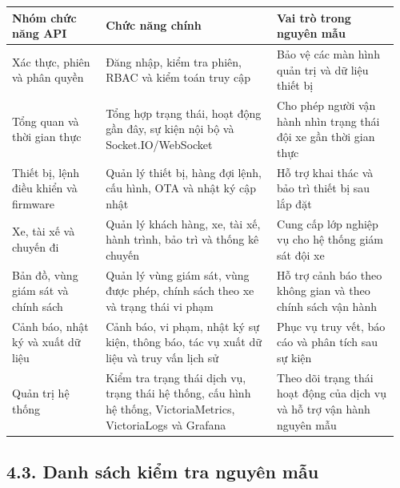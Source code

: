 \documentclass[a4paper]{extarticle}
\newcounter{none} %
\begin{document}
{\def\LTcaptype{none} %
\begin{longtable}{|L{0.235\linewidth}|L{0.425\linewidth}|L{0.300\linewidth}|}
\hline
\textbf{Nhóm chức năng API} & \textbf{Chức năng chính} & \textbf{Vai trò trong nguyên mẫu} \\
\hline
\endhead
\endfoot
\endlastfoot
Xác thực, phiên và phân quyền & Đăng nhập, kiểm tra phiên, RBAC và kiểm toán truy cập & Bảo vệ các màn hình quản trị và dữ liệu thiết bị \\\hline
Tổng quan và thời gian thực & Tổng hợp trạng thái, hoạt động gần đây, sự kiện nội bộ và Socket.IO/WebSocket & Cho phép người vận hành nhìn trạng thái đội xe gần thời gian thực \\\hline
Thiết bị, lệnh điều khiển và firmware & Quản lý thiết bị, hàng đợi lệnh, cấu hình, OTA và nhật ký cập nhật & Hỗ trợ khai thác và bảo trì thiết bị sau lắp đặt \\\hline
Xe, tài xế và chuyến đi & Quản lý khách hàng, xe, tài xế, hành trình, bảo trì và thống kê chuyến & Cung cấp lớp nghiệp vụ cho hệ thống giám sát đội xe \\\hline
Bản đồ, vùng giám sát và chính sách & Quản lý vùng giám sát, vùng được phép, chính sách theo xe và trạng thái vi phạm & Hỗ trợ cảnh báo theo không gian và theo chính sách vận hành \\\hline
Cảnh báo, nhật ký và xuất dữ liệu & Cảnh báo, vi phạm, nhật ký sự kiện, thông báo, tác vụ xuất dữ liệu và truy vấn lịch sử & Phục vụ truy vết, báo cáo và phân tích sau sự kiện \\\hline
Quản trị hệ thống & Kiểm tra trạng thái dịch vụ, trạng thái hệ thống, cấu hình hệ thống, VictoriaMetrics, VictoriaLogs và Grafana & Theo dõi trạng thái hoạt động của dịch vụ và hỗ trợ vận hành nguyên mẫu \\\hline
\end{longtable}
}

\subsection{4.3. Danh sách kiểm tra nguyên mẫu}\label{app4-prototype-checklist-cap-nhat}
\end{document}
